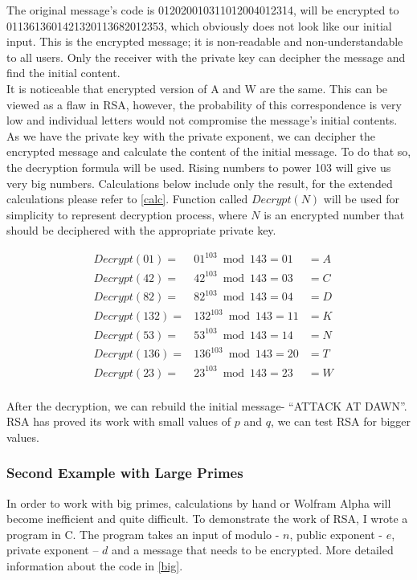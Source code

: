 \documentclass[a4paper, 12pt]{article}
\begin{document}
The original message's code is 012020010311012004012314, will be encrypted to
0113613601421320113682012353, which obviously does not look like our initial input. This is
the encrypted message; it is non-readable and non-understandable to all users. Only the receiver
with the private key can decipher the message and find the initial content.\\

It is noticeable that encrypted version of A and W are the same. This can be viewed as a flaw in RSA, however,
the probability of this correspondence is very low and individual letters would not compromise the message's
initial contents.\\

As we have the private key with the private exponent, we can decipher the encrypted message and
calculate the content of the initial message. To do that so, the decryption formula will be used. Rising
numbers to power 103 will give us very big numbers. Calculations below include only the result,
for the extended calculations please refer to \ref{calc}. Function called $Decrypt(N)$ will be used
for simplicity to represent decryption process, where $N$ is an encrypted number that should be
deciphered with the appropriate private key.

\begin{align*}
  &Decrypt(01)=&01^{103} \bmod 143=01&=A\\
  &Decrypt(42)=&42^{103} \bmod 143=03&=C\\
  &Decrypt(82)=&82^{103} \bmod 143=04&=D\\
  &Decrypt(132)=&132^{103} \bmod 143=11&=K\\
  &Decrypt(53)=&53^{103} \bmod 143=14&=N\\
  &Decrypt(136)=&136^{103} \bmod 143=20&=T\\
  &Decrypt(23)=&23^{103} \bmod 143=23&=W\\
\end{align*}

After the decryption, we can rebuild the initial message- “ATTACK AT DAWN”.
RSA has proved its work with small values of $p$ and $q$, we can test RSA for bigger values.

\subsubsection{Second Example with Large Primes}
\label{bbsec:second}

In order to work with big primes, calculations by hand or Wolfram Alpha will become inefficient
and quite difficult. To demonstrate the work of RSA, I wrote a program in C. 
The program takes an input of modulo - $n$, public exponent - $e$, private exponent – $d$
and a message that needs to be encrypted. More detailed information about the code in
\ref{big}.\\
\end{document}
